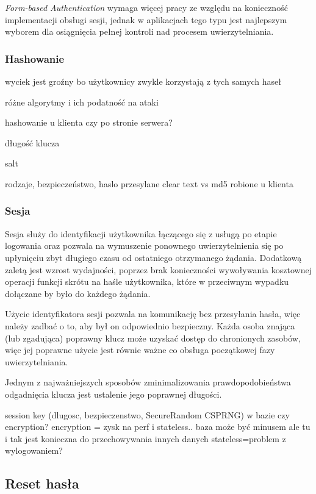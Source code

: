 \documentclass[11pt]{aghdpl}
\begin{document}
\emph{Form-based Authentication} wymaga więcej pracy ze względu na konieczność implementacji obsługi sesji, jednak w aplikacjach tego typu jest najlepszym wyborem dla osiągnięcia pełnej kontroli nad procesem uwierzytelniania.

\subsubsection{Hashowanie}
\label{sec:hashowanie}

wyciek jest groźny bo użytkownicy zwykle korzystają z tych samych haseł

różne algorytmy i ich podatność na ataki

hashowanie u klienta czy po stronie serwera?

długość klucza

salt

rodzaje, bezpieczeństwo, haslo przesylane clear text vs md5 robione u klienta

\subsubsection{Sesja}
\label{sec:sesja}

Sesja służy do identyfikacji użytkownika łączącego się z usługą po etapie logowania oraz pozwala na wymuszenie ponownego uwierzytelnienia się po upłynięciu zbyt długiego czasu od ostatniego otrzymanego żądania. Dodatkową zaletą jest wzrost wydajności, poprzez brak konieczności wywoływania kosztownej operacji funkcji skrótu na haśle użytkownika, które w przeciwnym wypadku dołączane by było do każdego żądania.

Użycie identyfikatora sesji pozwala na komunikację bez przesyłania hasła, więc należy zadbać o to, aby był on odpowiednio bezpieczny. Każda osoba znająca (lub zgadująca) poprawny klucz może uzyskać dostęp do chronionych zasobów, więc jej poprawne użycie jest równie ważne co obsługa początkowej fazy uwierzytelniania.

Jednym z najważniejszych sposobów zminimalizowania prawdopodobieństwa odgadnięcia klucza jest ustalenie jego poprawnej długości. %

session key (dlugosc, bezpieczenstwo, SecureRandom CSPRNG) w bazie czy encryption? encryption = zysk na perf i stateless.. baza może być minusem ale tu i tak jest konieczna do przechowywania innych danych
stateless=problem z wylogowaniem?
\subsection{Reset hasła}
\end{document}
